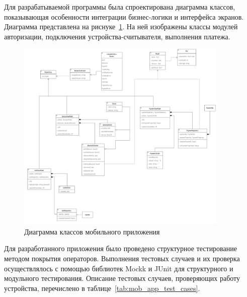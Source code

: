 Для разрабатываемой программы была спроектирована диаграмма классов, показывающая особенности интеграции бизнес-логики и интерфейса экранов.
Диаграмма представлена на риснуке~\ref{fig:classes}.
На ней изображены классы модулей авторизации, подключения устройства-считывателя, выполнения платежа.

\begin{figure}[H]
    \centering
    \includegraphics[width=0.9\textwidth]{images/design/classes}
    \caption{\centering Диаграмма классов мобильного приложения}
    \label{fig:classes}
\end{figure}

Для разработанного приложения было проведено структурное тестирование методом покрытия операторов.
Выполнения тестовых случаев и их проверка осуществлялось с помощью библиотек Mockk и JUnit для структурного и модульного тестирования.
Описание тестовых случаев, проверяющих работу устройства, перечислено в таблице~\ref{tab:mob_app_test_cases}.

